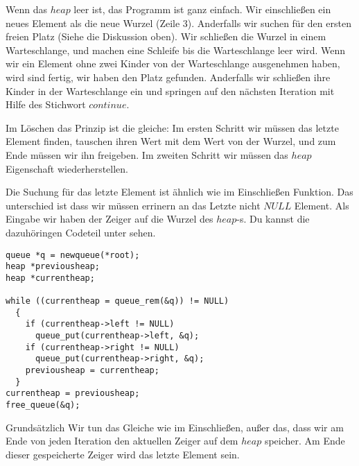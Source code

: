 Wenn das $heap$ leer ist, das Programm ist ganz einfach. Wir einschließen ein neues 
Element als die neue Wurzel (Zeile 3). Anderfalls wir suchen für den ersten freien Platz
(Siehe die Diskussion oben). Wir schließen die Wurzel in einem Warteschlange, und 
machen eine Schleife bis die Warteschlange leer wird. Wenn wir ein Element
ohne zwei Kinder von der Warteschlange ausgenehmen haben, wird sind fertig, wir
haben den Platz gefunden. Anderfalls wir schließen ihre Kinder in der Warteschlange
ein und springen auf den nächsten Iteration mit Hilfe des Stichwort $continue$.

Im Löschen das Prinzip ist die gleiche: Im ersten Schritt wir müssen das letzte Element 
finden, tauschen ihren Wert mit dem Wert von der Wurzel, und zum Ende müssen wir ihn
freigeben. Im zweiten Schritt wir müssen das $heap$ Eigenschaft wiederherstellen.

Die Suchung für das letzte Element ist ähnlich wie im Einschließen Funktion. Das
unterschied ist dass wir müssen errinern an das Letzte nicht $NULL$ Element. Als 
Eingabe wir haben der Zeiger auf die Wurzel des $heap$-s. Du kannst die dazuhöringen
Codeteil unter sehen.
\begin{lstlisting}
queue *q = newqueue(*root);
heap *previousheap;
heap *currentheap;

while ((currentheap = queue_rem(&q)) != NULL)
  {
    if (currentheap->left != NULL)
      queue_put(currentheap->left, &q);
    if (currentheap->right != NULL)
      queue_put(currentheap->right, &q);
    previousheap = currentheap;
  }
currentheap = previousheap;
free_queue(&q);
\end{lstlisting}
Grundsätzlich Wir tun das Gleiche wie im Einschließen, außer das, dass wir am Ende 
von jeden Iteration den aktuellen Zeiger auf dem $heap$ speicher. Am Ende 
dieser gespeicherte Zeiger wird das letzte Element sein. 

